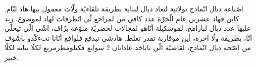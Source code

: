 اصّناعة ديال انّمادج تولاتية لبعاد ديال لبناية بطريقة تلقاءيّة ولّات معمول بيها هاد ليّام.
كاين فهاد عشرين عام الّخرّة عدد كافي من لمراجع لّي اتّطرقات لهاد لموضوع، زيد عليها عدد ديال لبارامج.
لموشكيلة أنّاهو لمجالات لحضريّة منوّعة بزّاف، اشّي الّي تيخلّي أنّا، بطريقة ولّا اخرة، أين موقاربة تقدر تغلط.
هادشي تيدفع فلواقع أنّانا نتءكّدو باشّوف من اصّحة ديال انّمادج، لقاضيّة الّي تاتاخد عاداتان 2 سوايع فكيلومطرمربع لكلّا بناية لكلّا خبير.
